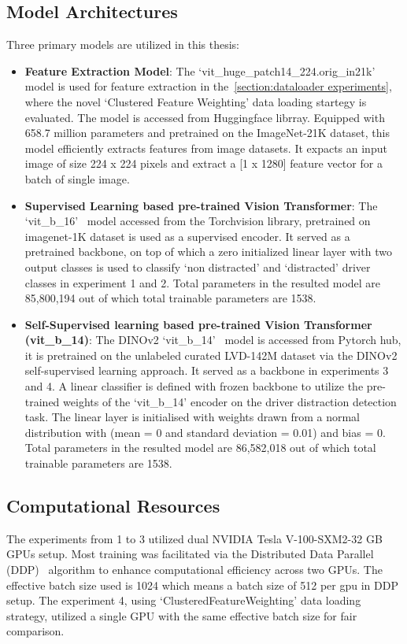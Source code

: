 \subsection{Model Architectures}
Three primary models are utilized in this thesis:
\begin{itemize}
    \item \textbf{Feature Extraction Model}: The `vit\_huge\_patch14\_224.orig\_in21k'~\citep{huggingface_vit} model is used for feature extraction in the~\ref{section:dataloader experiments}, where the novel `Clustered Feature Weighting' data loading startegy is evaluated. The model is accessed from Huggingface librray. Equipped with 658.7 million parameters and pretrained on the ImageNet-21K dataset, this model efficiently extracts features from image datasets. It expacts an input image of size 224 x 224 pixels and extract a [1 x 1280] feature vector for a batch of single image.
    \item \textbf{Supervised Learning based pre-trained Vision Transformer}: The `vit\_b\_16'~\citep{vit_b_16_pytorch} model accessed from the Torchvision library, pretrained on imagenet-1K dataset is used as a supervised encoder. It served as a pretrained backbone, on top of which a zero initialized linear layer with two output classes is used to classify `non distracted' and `distracted' driver classes in experiment 1 and 2. Total parameters in the resulted model are 85,800,194 out of which total trainable parameters are 1538.
    \item \textbf{Self-Supervised learning based pre-trained Vision Transformer (vit\_b\_14)}: The DINOv2 `vit\_b\_14'~\citep{dinov2_github} model is accessed from Pytorch hub, it is pretrained on the unlabeled curated LVD-142M dataset via the DINOv2~\citep{dinov2_oquab2023dinov2} self-supervised learning approach. It served as a backbone in experiments 3 and 4. A linear classifier is defined with frozen backbone to utilize the pre-trained weights of the `vit\_b\_14' encoder on the driver distraction detection task. The linear layer is initialised with weights drawn from a normal distribution with (mean = 0 and standard deviation = 0.01) and bias = 0. Total parameters in the resulted model are 86,582,018 out of which total trainable parameters are 1538.
\end{itemize}

\subsection{Computational Resources}
The experiments from 1 to 3 utilized dual NVIDIA Tesla V-100-SXM2-32 GB GPUs setup. Most training was facilitated via the Distributed Data Parallel (DDP)~\citep{DDP_pytorch_DBLP:journals/corr/abs-2006-15704, pytorch_ddp} algorithm to enhance computational efficiency across two GPUs. The effective batch size used is 1024 which means a batch size of 512 per gpu in DDP setup. The experiment 4, using `ClusteredFeatureWeighting' data loading strategy, utilized a single GPU with the same effective batch size for fair comparison.

